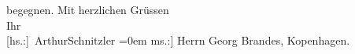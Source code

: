 \begin{ledgroupsized}[t]{13cm}
               begegnen.\pend
           \pstart
           Mit herzlichen Grüssen{\\[\baselineskip]}Ihr{\\[\baselineskip]}\spacefill\mbox{{[}hs.:{]} ArthurSchnitzler}\pend
           \leftskip=0em{}\pstart
           \noindent{}{[}ms.:{]} Herrn Georg Brandes, Kopenhagen.\pend
                     \endnumbering{}\end{ledgroupsized}  \newcommand{\dateiname}{L02114}\newcommand{\titel}{Arthur Schnitzler an Georg Brandes, 27. 2. 1913}\newcommand{\editorInnen}{Martin Anton Müller und Gerd-Hermann Susen}
            \footnotesize
\begin{ledgroupsized}[t]{11.5cm}
\end{ledgroupsized}
         
      